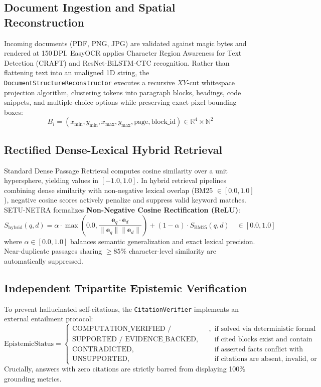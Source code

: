 \documentclass[11pt,a4paper]{article}
\begin{document}
\subsection{Document Ingestion and Spatial Reconstruction}
Incoming documents (PDF, PNG, JPG) are validated against magic bytes and rendered at 150\,DPI. EasyOCR applies Character Region Awareness for Text Detection (CRAFT) and ResNet-BiLSTM-CTC recognition. Rather than flattening text into an unaligned 1D string, the \texttt{DocumentStructureReconstructor} executes a recursive $XY$-cut whitespace projection algorithm, clustering tokens into paragraph blocks, headings, code snippets, and multiple-choice options while preserving exact pixel bounding boxes:
\begin{equation}
    B_i = \left( x_{\min}, y_{\min}, x_{\max}, y_{\max}, \text{page}, \text{block\_id} \right) \in \mathbb{R}^4 \times \mathbb{N}^2
\end{equation}

\subsection{Rectified Dense-Lexical Hybrid Retrieval}
Standard Dense Passage Retrieval computes cosine similarity over a unit hypersphere, yielding values in $[-1.0, 1.0]$. In hybrid retrieval pipelines combining dense similarity with non-negative lexical overlap (BM25 $\in [0.0, 1.0]$), negative cosine scores actively penalize and suppress valid keyword matches. SETU-NETRA formalizes \textbf{Non-Negative Cosine Rectification (ReLU)}:
\begin{equation}
    S_{\text{hybrid}}(q, d) = \alpha \cdot \max\left(0.0, \frac{\mathbf{e}_q \cdot \mathbf{e}_d}{\|\mathbf{e}_q\| \|\mathbf{e}_d\|}\right) + (1 - \alpha) \cdot S_{\text{BM25}}(q, d) \quad \in [0.0, 1.0]
\end{equation}
where $\alpha \in [0.0, 1.0]$ balances semantic generalization and exact lexical precision. Near-duplicate passages sharing $\ge 85\%$ character-level similarity are automatically suppressed.

\subsection{Independent Tripartite Epistemic Verification}
To prevent hallucinated self-citations, the \texttt{CitationVerifier} implements an external entailment protocol:
\begin{equation}
    \text{EpistemicStatus} = 
    \begin{cases}
        \text{COMPUTATION\_VERIFIED / LOGIC\_VERIFIED}, & \text{if solved via deterministic formal provers} \\
        \text{SUPPORTED / EVIDENCE\_BACKED}, & \text{if cited blocks exist and contain asserted tokens} \\
        \text{CONTRADICTED}, & \text{if asserted facts conflict with retrieved context} \\
        \text{UNSUPPORTED}, & \text{if citations are absent, invalid, or empty}
    \end{cases}
\end{equation}
Crucially, answers with zero citations are strictly barred from displaying 100\% grounding metrics.
\end{document}
